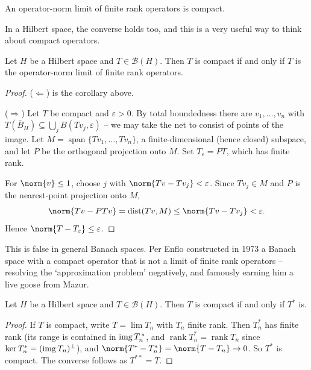 \documentclass[a4paper]{scrartcl}
\newcommand{\spn}{\operatorname{span}}
\newcommand{\Bop}{\mathcal{B}}
\DeclareMathOperator{\dist}{dist}
\DeclareMathOperator{\rank}{rank}
\begin{document}
\begin{corollary}
	An operator-norm limit of finite rank operators is compact.
\end{corollary}

In a Hilbert space, the converse holds too, and this is a very useful way to think about compact operators.

\begin{theorem}
	Let $H$ be a Hilbert space and $T\in\Bop(H)$. Then $T$ is compact if and only if $T$ is the operator-norm limit of finite rank operators.
\end{theorem}

\begin{proof}
	($\Leftarrow$) is the corollary above.

	($\Rightarrow$) Let $T$ be compact and $\varepsilon>0$. By total boundedness there are $v_1,\dots,v_n$ with $T(\bar B_H)\subseteq\bigcup_j B(Tv_j,\varepsilon)$ -- we may take the net to consist of points of the image. Let $M = \spn\{Tv_1,\dots,Tv_n\}$, a finite-dimensional (hence closed) subspace, and let $P$ be the orthogonal projection onto $M$. Set $T_\varepsilon = PT$, which has finite rank.

	For $\norm{v}\leq1$, choose $j$ with $\norm{Tv - Tv_j}<\varepsilon$. Since $Tv_j \in M$ and $P$ is the nearest-point projection onto $M$,
	$$\norm{Tv - PTv} = \dist(Tv, M)\leq\norm{Tv - Tv_j}<\varepsilon.$$
	Hence $\norm{T - T_\varepsilon}\leq\varepsilon$.
\end{proof}

\begin{remark}
	This is false in general Banach spaces. Per Enflo constructed in 1973 a Banach space with a compact operator that is not a limit of finite rank operators -- resolving the `approximation problem' negatively, and famously earning him a live goose from Mazur.
\end{remark}

\begin{proposition}
	Let $H$ be a Hilbert space and $T \in \Bop(H)$. Then $T$ is compact if and only if $T^*$ is.
\end{proposition}

\begin{proof}
	If $T$ is compact, write $T = \lim T_n$ with $T_n$ finite rank. Then $T_n^*$ has finite rank (its range is contained in $\operatorname{img} T_n^{\,*}$, and $\rank T_n^* = \rank T_n$ since $\ker T_n^* = (\operatorname{img} T_n)^\perp$), and $\norm{T^*-T_n^*}=\norm{T-T_n}\to0$. So $T^*$ is compact. The converse follows as $T^{**}=T$.
\end{proof}
\end{document}
